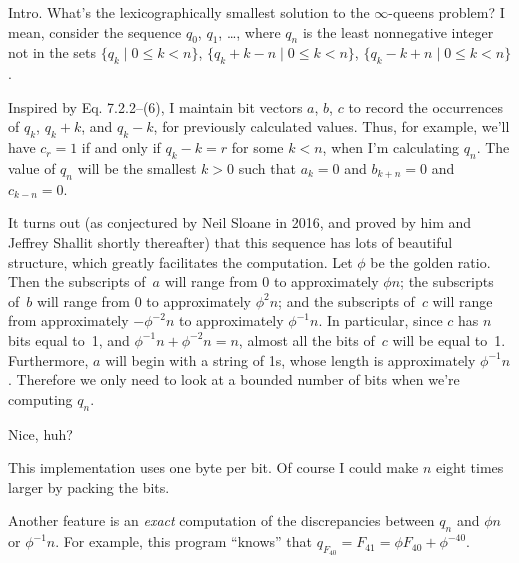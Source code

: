 

Intro. What's the lexicographically smallest solution to the
$\infty$-queens problem? I mean, consider the sequence $q_0$, $q_1$, \dots,
where $q_n$ is the least nonnegative integer not in the sets
$\{q_k\mid 0\le k<n\}$,
$\{q_k+k-n\mid 0\le k<n\}$,
$\{q_k-k+n\mid 0\le k<n\}$.

Inspired by Eq. 7.2.2--(6), I maintain bit vectors $a$, $b$, $c$
to record the occurrences of $q_k$, $q_k+k$, and $q_k-k$, for
previously calculated values. Thus, for example, we'll have
$c_r=1$ if and only if $q_k-k=r$ for some $k<n$, when I'm calculating $q_n$.
The value of $q_n$ will be the smallest $k>0$ such that $a_k=0$ and
$b_{k+n}=0$ and $c_{k-n}=0$.

It turns out (as conjectured by Neil Sloane in 2016, and proved
by him and Jeffrey Shallit shortly thereafter) that this sequence
has lots of beautiful structure, which greatly facilitates the
computation. Let $\phi$ be the golden ratio. Then the subscripts of~$a$
will range from 0 to approximately $\phi n$; the subscripts
of~$b$ will range from 0 to approximately $\phi^2 n$; and the subscripts
of~$c$ will range from approximately $-\phi^{-2}n$ to approximately
$\phi^{-1}n$. In particular, since $c$ has $n$ bits equal to~1,
and $\phi^{-1}n+\phi^{-2}n=n$, almost all the bits of~$c$ will
be equal to~1. Furthermore, $a$ will begin with a string of 1s,
whose length is approximately $\phi^{-1}n$. Therefore we only
need to look at a bounded number of bits when we're computing $q_n$.

Nice, huh?

This implementation uses one byte per bit. Of course I could
make $n$ eight times larger by packing the bits.

Another feature is an {\it exact\/} computation of the
discrepancies between $q_n$ and $\phi n$ or $\phi^{-1}n$.
For example, this program ``knows'' that
$q_{F_{40}}=F_{41}=\phi F_{40}+\phi^{-40}$.

